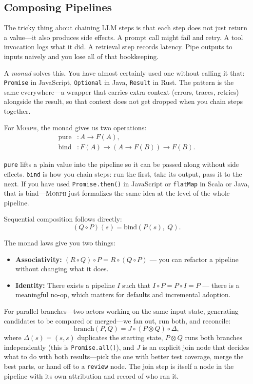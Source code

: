 \documentclass{article}
\begin{document}
\subsection{Composing Pipelines}

The tricky thing about chaining LLM steps is that each step does not just
return a value---it also produces side effects. A prompt call might fail and
retry. A tool invocation logs what it did. A retrieval step records latency.
Pipe outputs to inputs naively and you lose all of that bookkeeping.

A \emph{monad} solves this. You have almost certainly used one without calling
it that: \texttt{Promise} in JavaScript, \texttt{Optional} in Java,
\texttt{Result} in Rust. The pattern is the same everywhere---a wrapper that
carries extra context (errors, traces, retries) alongside the result, so that
context does not get dropped when you chain steps together.

For \textsc{Morph}, the monad gives us two operations:
\begin{align}
  \text{pure} &: A \to F(A), \\
  \text{bind} &: F(A) \to (A \to F(B)) \to F(B).
\end{align}

\noindent \texttt{pure} lifts a plain value into the pipeline so it can be
passed along without side effects. \texttt{bind} is how you chain steps: run
the first, take its output, pass it to the next. If you have used
\texttt{Promise.then()} in JavaScript or \texttt{flatMap} in Scala or Java,
that is bind---\textsc{Morph} just formalizes the same idea at the level of the
whole pipeline.

Sequential composition follows directly:
\begin{equation}
  (Q \circ P)(s) = \text{bind}(P(s),\; Q).
\end{equation}

\noindent The monad laws give you two things:
\begin{itemize}[nosep]
  \item \textbf{Associativity:} $(R \circ Q) \circ P = R \circ (Q \circ P)$
    --- you can refactor a pipeline without changing what it does.
  \item \textbf{Identity:} There exists a pipeline $I$ such that $I
    \circ P = P \circ I = P$ --- there is a meaningful no-op, which matters
    for defaults and incremental adoption.
\end{itemize}

For parallel branches---two actors working on the same input state, generating
candidates to be compared or merged---we fan out, run both, and reconcile:
\begin{equation}
  \text{branch}(P, Q) = J \circ (P \otimes Q) \circ \Delta,
\end{equation}
where $\Delta(s) = (s, s)$ duplicates the starting state, $P \otimes Q$ runs
both branches independently (this is \texttt{Promise.all()}), and $J$ is an
explicit join node that decides what to do with both results---pick the one with
better test coverage, merge the best parts, or hand off to a \texttt{review}
node. The join step is itself a node in the pipeline with its own attribution
and record of who ran it.
\end{document}
